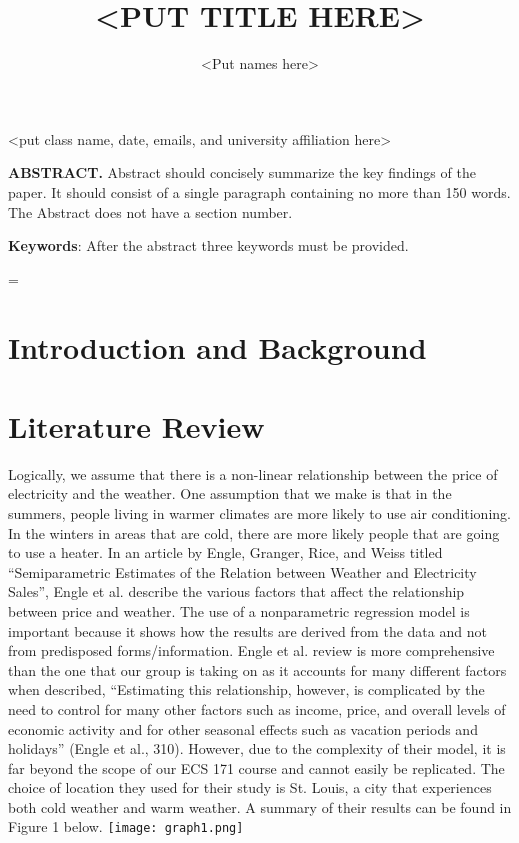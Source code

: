 \documentclass[10pt]{article}
\title{\renewcommand{\baselinestretch}{1.17}\normalsize\bf%
\uppercase{<Put Title Here>}
}
\author{
<Put names here>
}
\begin{document}
\date{}

\maketitle

\vspace{-0.5cm}

\begin{center}
{\footnotesize 
<put class name, date, emails, and university affiliation here>
}
\end{center}
\bigskip
\noindent
{\small{\bf ABSTRACT.}
Abstract should concisely
summarize the key findings of the paper. It should consist 
of a single paragraph containing no more than 150 words. 
The Abstract does not have a section number.
}

\medskip
\noindent
{\small{\bf Keywords}{:} 
After the abstract three keywords must be provided.
}

\baselineskip=\normalbaselineskip

\section{Introduction and Background}\label{sec:1}

\section{Literature Review}\label{sec:2}
Logically, we assume that there is a non-linear relationship between the price of electricity and the weather. One assumption that we make is that in the summers, people living in warmer climates are more likely to use air conditioning. In the winters in areas that are cold, there are more likely people that are going to use a heater. In an article by Engle, Granger, Rice, and Weiss titled “Semiparametric Estimates of the Relation between Weather and Electricity Sales”, Engle et al. describe the various factors that affect the relationship between price and weather. The use of a nonparametric regression model is important because it shows how the results are derived from the data and not from predisposed forms/information. Engle et al. review is more comprehensive than the one that our group is taking on as it accounts for many different factors when described, “Estimating this relationship, however, is complicated by the need to control for many other factors such as income, price, and overall levels of economic activity and for other seasonal effects such as vacation periods and holidays” (Engle et al., 310). However, due to the complexity of their model, it is far beyond the scope of our ECS 171 course and cannot easily be replicated. The choice of location they used for their study is St. Louis, a city that experiences both cold weather and warm weather. A summary of their results can be found in Figure 1 below.
\texttt{[image: graph1.png]}
\end{document}
